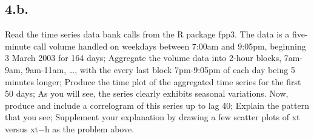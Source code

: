 \documentclass[
]{article}
\begin{document}
\hypertarget{b.-1}{%
\subsection{4.b.}\label{b.-1}}

Read the time series data bank calls from the R package fpp3. The data
is a five-minute call volume handled on weekdays between 7:00am and
9:05pm, beginning 3 March 2003 for 164 days; Aggregate the volume data
into 2-hour blocks, 7am-9am, 9am-11am, \ldots, with the every last block
7pm-9:05pm of each day being 5 minutes longer; Produce the time plot of
the aggregated time series for the first 50 days; As you will see, the
series clearly exhibits seasonal variations. Now, produce and include a
correlogram of this series up to lag 40; Explain the pattern that you
see; Supplement your explanation by drawing a few scatter plots of xt
versus xt−h as the problem above.
\end{document}
